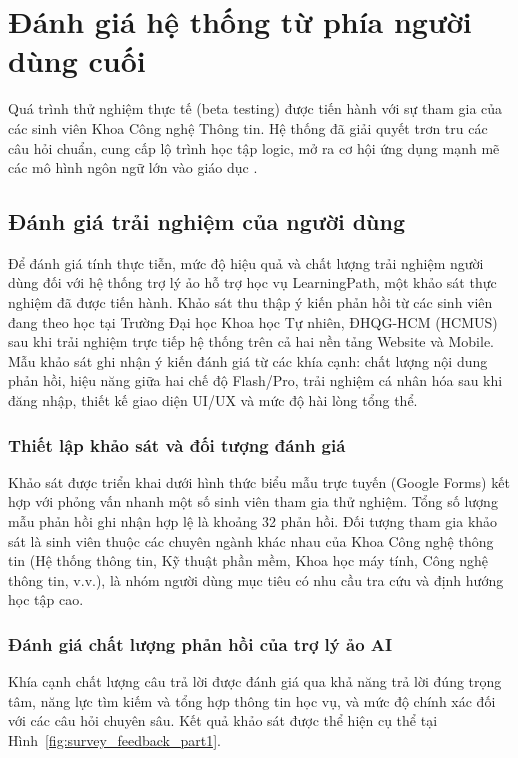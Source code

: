 \section{Đánh giá hệ thống từ phía người dùng cuối}
Quá trình thử nghiệm thực tế (beta testing) được tiến hành với sự tham gia của các sinh viên Khoa Công nghệ Thông tin. Hệ thống đã giải quyết trơn tru các câu hỏi chuẩn, cung cấp lộ trình học tập logic, mở ra cơ hội ứng dụng mạnh mẽ các mô hình ngôn ngữ lớn vào giáo dục \cite{kasneci2023chatgpt}. 

\subsection{Đánh giá trải nghiệm của người dùng}

Để đánh giá tính thực tiễn, mức độ hiệu quả và chất lượng trải nghiệm người dùng đối với hệ thống trợ lý ảo hỗ trợ học vụ LearningPath, một khảo sát thực nghiệm đã được tiến hành. Khảo sát thu thập ý kiến phản hồi từ các sinh viên đang theo học tại Trường Đại học Khoa học Tự nhiên, ĐHQG-HCM (HCMUS) sau khi trải nghiệm trực tiếp hệ thống trên cả hai nền tảng Website và Mobile. Mẫu khảo sát ghi nhận ý kiến đánh giá từ các khía cạnh: chất lượng nội dung phản hồi, hiệu năng giữa hai chế độ Flash/Pro, trải nghiệm cá nhân hóa sau khi đăng nhập, thiết kế giao diện UI/UX và mức độ hài lòng tổng thể.

\subsubsection{Thiết lập khảo sát và đối tượng đánh giá}
Khảo sát được triển khai dưới hình thức biểu mẫu trực tuyến (Google Forms) kết hợp với phỏng vấn nhanh một số sinh viên tham gia thử nghiệm. Tổng số lượng mẫu phản hồi ghi nhận hợp lệ là khoảng 32 phản hồi. Đối tượng tham gia khảo sát là sinh viên thuộc các chuyên ngành khác nhau của Khoa Công nghệ thông tin (Hệ thống thông tin, Kỹ thuật phần mềm, Khoa học máy tính, Công nghệ thông tin, v.v.), là nhóm người dùng mục tiêu có nhu cầu tra cứu và định hướng học tập cao.

\subsubsection{Đánh giá chất lượng phản hồi của trợ lý ảo AI}
Khía cạnh chất lượng câu trả lời được đánh giá qua khả năng trả lời đúng trọng tâm, năng lực tìm kiếm và tổng hợp thông tin học vụ, và mức độ chính xác đối với các câu hỏi chuyên sâu. Kết quả khảo sát được thể hiện cụ thể tại Hình~\ref{fig:survey_feedback_part1}.


